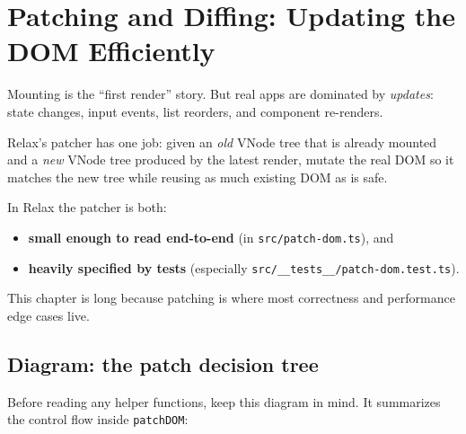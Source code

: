 \chapter{Patching and Diffing: Updating the DOM Efficiently}
\label{ch:patching-diffing}

Mounting is the ``first render'' story. But real apps are dominated by \emph{updates}: state changes, input events, list reorders, and component re-renders.

Relax's patcher has one job: given an \emph{old} VNode tree that is already mounted and a \emph{new} VNode tree produced by the latest render, mutate the real DOM so it matches the new tree while reusing as much existing DOM as is safe.

In Relax the patcher is both:

\begin{itemize}
  \item \textbf{small enough to read end-to-end} (in \texttt{src/patch-dom.ts}), and
  \item \textbf{heavily specified by tests} (especially \texttt{src/\_\_tests\_\_/patch-dom.test.ts}).
\end{itemize}

This chapter is long because patching is where most correctness and performance edge cases live.

\section{Diagram: the patch decision tree}
Before reading any helper functions, keep this diagram in mind. It summarizes the control flow inside \texttt{patchDOM}:

